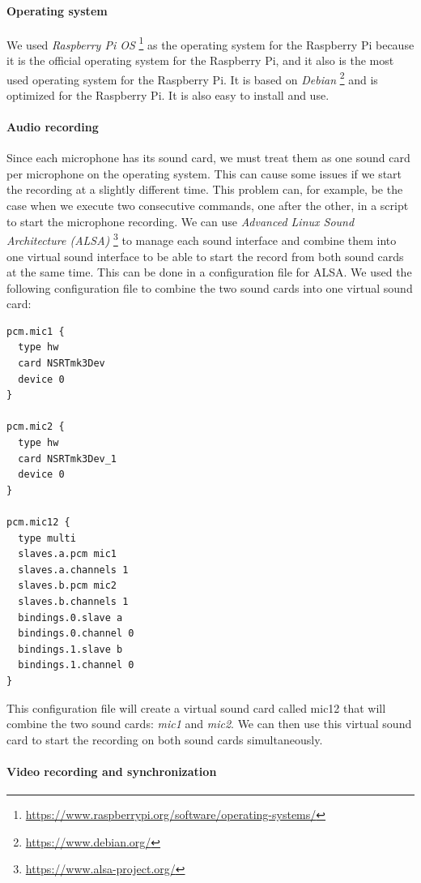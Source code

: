 \paragraph{Operating system}

We used \textit{Raspberry Pi OS} \footnote{\url{https://www.raspberrypi.org/software/operating-systems/}} as the operating system for the Raspberry Pi because it is the official operating system for the Raspberry Pi, and it also is the most used operating system for the Raspberry Pi. It is based on \textit{Debian} \footnote{\url{https://www.debian.org/}} and is optimized for the Raspberry Pi. It is also easy to install and use.

\paragraph{Audio recording}

Since each microphone has its sound card, we must treat them as one sound card per microphone on the operating system. This can cause some issues if we start the recording at a slightly different time. This problem can, for example, be the case when we execute two consecutive commands, one after the other, in a script to start the microphone recording. We can use \textit{Advanced Linux Sound Architecture (ALSA)} \footnote{\url{https://www.alsa-project.org/}} to manage each sound interface and combine them into one virtual sound interface to be able to start the record from both sound cards at the same time. This can be done in a configuration file for ALSA. We used the following configuration file to combine the two sound cards into one virtual sound card:

\begin{lstlisting}
pcm.mic1 {
  type hw
  card NSRTmk3Dev
  device 0
}

pcm.mic2 {
  type hw
  card NSRTmk3Dev_1
  device 0
}

pcm.mic12 {
  type multi
  slaves.a.pcm mic1
  slaves.a.channels 1
  slaves.b.pcm mic2
  slaves.b.channels 1
  bindings.0.slave a
  bindings.0.channel 0
  bindings.1.slave b
  bindings.1.channel 0
}
\end{lstlisting}

This configuration file will create a virtual sound card called mic12 that will combine the two sound cards: \textit{mic1} and \textit{mic2}. We can then use this virtual sound card to start the recording on both sound cards simultaneously.

\paragraph{Video recording and synchronization}

